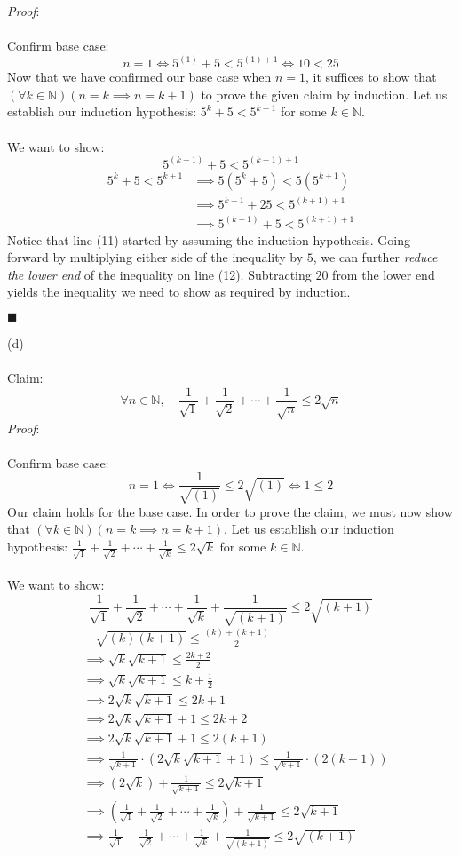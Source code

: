 \documentclass[12pt]{article}
\begin{document}
\emph{Proof}:\\\\
Confirm base case:
$$n=1 \iff 5^{(1)}+5<5^{(1)+1} \iff 10 < 25$$
Now that we have confirmed our base case when $n=1$, it suffices to show that $(\forall k \in \mathbb{N})(n=k \implies n=k+1)$ to prove the given claim by induction. Let us establish our induction hypothesis: $5^k+5<5^{k+1}$ for some $k \in \mathbb{N}$.\\\\
We want to show: $$\boxed{5^{(k+1)}+5<5^{(k+1)+1}}$$
\begin{align}
5^k+5<5^{k+1} &\implies 5(5^k+5)<5(5^{k+1})\\
&\implies 5^{k+1}+25<5^{(k+1)+1}\\
&\implies 5^{(k+1)}+5<5^{(k+1)+1}
\end{align}
Notice that line (11) started by assuming the induction hypothesis. Going forward by multiplying either side of the inequality by $5$, we can further \emph{reduce the lower end} of the inequality on line (12). Subtracting $20$ from the lower end yields the inequality we need to show as required by induction.
\begin{flushright}
$\blacksquare$
\end{flushright}
(d)\\\\
Claim:
$$\forall n \in \mathbb{N}, \quad \frac{1}{\sqrt{1}}+\frac{1}{\sqrt{2}}+\cdots+\frac{1}{\sqrt{n}} \leq 2 \sqrt{n}$$
\emph{Proof}:\\\\
Confirm base case:
$$n=1 \iff \frac{1}{\sqrt{(1)}} \leq 2 \sqrt{(1)} \iff 1 \leq 2$$
Our claim holds for the base case. In order to prove the claim, we must now show that $(\forall k \in \mathbb{N})(n=k \implies n=k+1)$. Let us establish our induction hypothesis: $\frac{1}{\sqrt{1}}+\frac{1}{\sqrt{2}}+\cdots+\frac{1}{\sqrt{k}} \leq 2 \sqrt{k}$ for some $k \in \mathbb{N}$.\\\\
We want to show: $$\boxed{\frac{1}{\sqrt{1}}+\frac{1}{\sqrt{2}}+\cdots+\frac{1}{\sqrt{k}}+\frac{1}{\sqrt{(k+1)}} \leq 2 \sqrt{(k+1)}}$$
\begin{align}
&\quad \sqrt{(k)(k+1)} \leq \frac{(k)+(k+1)}{2}\\ 
&\implies \sqrt{k}\sqrt{k+1} \leq \frac{2k+2}{2}\\
&\implies \sqrt{k}\sqrt{k+1} \leq k+\frac{1}{2}\\
&\implies 2\sqrt{k}\sqrt{k+1} \leq 2k + 1\\
&\implies 2\sqrt{k}\sqrt{k+1} + 1 \leq 2k + 2\\
&\implies 2\sqrt{k}\sqrt{k+1} + 1 \leq 2(k+1)\\
&\implies \frac{1}{\sqrt{k+1}}\cdot(2\sqrt{k}\sqrt{k+1} + 1) \leq \frac{1}{\sqrt{k+1}}\cdot(2(k+1))\\
&\implies (2\sqrt{k})+\frac{1}{\sqrt{k+1}} \leq 2\sqrt{k+1}\\
&\implies \left(\frac{1}{\sqrt{1}}+\frac{1}{\sqrt{2}}+\cdots+\frac{1}{\sqrt{k}}\right)+\frac{1}{\sqrt{k+1}} \leq 2\sqrt{k+1}\\
&\implies \frac{1}{\sqrt{1}}+\frac{1}{\sqrt{2}}+\cdots+\frac{1}{\sqrt{k}}+\frac{1}{\sqrt{(k+1)}} \leq 2 \sqrt{(k+1)}
\end{align}
\end{document}
